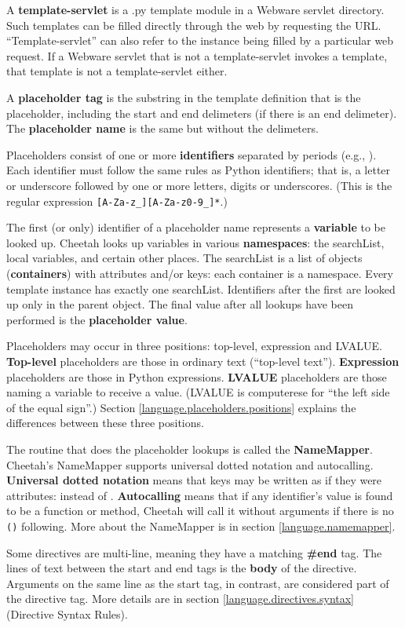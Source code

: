 A {\bf template-servlet} is a .py template module in a Webware servlet
directory.  Such templates can be filled directly through the web by requesting
the URL.  ``Template-servlet'' can also refer to the instance being filled by
a particular web request.  If a Webware servlet that is not a
template-servlet invokes a template, that template is not a template-servlet
either.

A {\bf placeholder tag} is the substring in the template
definition that is the placeholder, including the start and end delimeters (if
there is an end delimeter).  The {\bf placeholder name} is the same but without
the delimeters.  

Placeholders consist of one or more {\bf identifiers} separated by periods
(e.g., ).  Each identifier must follow the same rules as Python
identifiers; that is, a letter or underscore followed by one or more letters,
digits or underscores.  (This is the regular expression
\verb+[A-Za-z_][A-Za-z0-9_]*+.)

The first (or only) identifier of a placeholder name represents a {\bf
variable} to be looked up.  Cheetah looks up variables in various {\bf
namespaces}: the searchList, local variables, and certain other places.  The
searchList is a list of objects ({\bf containers}) with attributes
and/or keys: each container is a namespace.  Every template instance has
exactly one searchList.  Identifiers after the first are looked up only in
the parent object.  The final value after all lookups have been performed is
the {\bf placeholder value}.

Placeholders may occur in three positions: top-level, expression and LVALUE.
{\bf Top-level} placeholders are those in ordinary text (``top-level text'').
{\bf Expression} placeholders are those in Python expressions.  
{\bf LVALUE} placeholders are those naming a variable to receive a value.
(LVALUE is computerese for ``the left side of the equal sign''.)  Section 
\ref{language.placeholders.positions} explains the differences between these
three positions.

The routine that does the placeholder lookups is called the {\bf NameMapper}.
Cheetah's NameMapper supports universal dotted notation and autocalling.
{\bf Universal dotted notation} means that keys may be written as if they were
attributes:  instead of .  {\bf Autocalling} means that
if any identifier's value is found to be a function or method, Cheetah will
call it without arguments if there is no \verb+()+ following.  More about the
NameMapper is in section \ref{language.namemapper}.

Some directives are multi-line, meaning they have a matching {\bf \#end} tag.
The lines of text between the start and end tags is the {\bf body} of the
directive.  Arguments on the same line as the start tag, in contrast, are
considered part of the directive tag.  More details are in section
\ref{language.directives.syntax} (Directive Syntax Rules).


